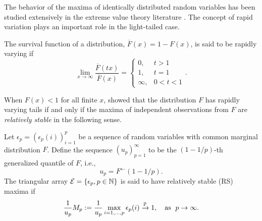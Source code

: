 
The behavior of the maxima of identically distributed random variables has been studied extensively in the extreme 
value theory literature \citep[see, e.g.,][and the references therein]{leadbetter2012extremes,resnick2013extreme,embrechts2013modelling,de2007extreme}. 
The concept of rapid variation plays an important role in the light-tailed case.

\begin{definition} \label{def:rapid-variation}
The survival function of a distribution, $\overline{F}(x) = 1 - F(x)$, is said to be rapidly varying if
\begin{equation}\label{e:def:rapid-variation}
\lim_{x\to\infty} \frac{\overline{F}(tx)}{\overline{F}(x)} 
    = \begin{cases}
    0, & t > 1\\
    1, & t = 1\\
    \infty, & 0 < t < 1
\end{cases}.
\end{equation}
\end{definition}

When $F(x)<1$ for all finite $x$, \citet{gnedenko1943distribution} showed that the distribution $F$ has rapidly varying tails if and only if the maxima of independent observations from $F$ are \emph{relatively stable} in the following sense.
\begin{definition} \label{def:RS}
Let $\epsilon_p = \left(\epsilon_p(i)\right)_{i=1}^p$ be a sequence of random variables with common marginal 
distribution $F$. Define the sequence $(u_p)_{p=1}^\infty$ to be the $(1-1/p)$-th generalized quantile of $F$, i.e., 
\begin{equation} \label{eq:quantiles}
    u_p = F^\leftarrow(1 - 1/p).
\end{equation}
The triangular array ${\cal E} = \{\epsilon_p, p\in\N\}$ is said to have relatively stable (RS) maxima if
\begin{equation} \label{eq:RS-condition}
    \frac{1}{u_{p}} M_p := \frac{1}{u_{p}} \max_{i=1,\ldots,p} \epsilon_p(i) \xrightarrow{\P} 1,\quad \text{as }\;p\to\infty.
\end{equation}
\end{definition}

